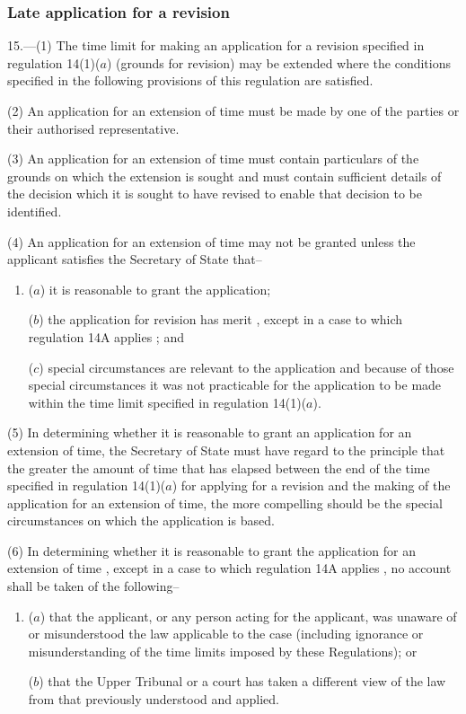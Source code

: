 \documentclass[12pt,a4paper]{article}
\begin{document}

\subsubsection[15. Late application for a revision]{Late application for a revision}

15.---(1)  The time limit for making an application for a revision specified in regulation 14(1)($a$)  (grounds for revision) may be extended where the conditions specified in the following provisions of this regulation are satisfied.

(2) An application for an extension of time must be made by one of the parties or their authorised representative.

(3) An application for an extension of time must contain particulars of the grounds on which the extension is sought and must contain sufficient details of the decision which it is sought to have revised to enable that decision to be identified.

(4) An application for an extension of time may not be granted unless the applicant satisfies the Secretary of State that–
\begin{enumerate}\item[]
($a$) it is reasonable to grant the application;

($b$) the application for revision has merit%
, except in a case to which regulation 14A applies%
; and

($c$) special circumstances are relevant to the application and because of those special circumstances it was not practicable for the application to be made within the time limit specified in regulation 14(1)($a$).
\end{enumerate}

(5) In determining whether it is reasonable to grant an application for an extension of time, the Secretary of State must have regard to the principle that the greater the amount of time that has elapsed between the end of the time specified in regulation 14(1)($a$)  for applying for a revision and the making of the application for an extension of time, the more compelling should be the special circumstances on which the application is based.

(6) In determining whether it is reasonable to grant the application for an extension of time%
, except in a case to which regulation 14A applies%
, no account shall be taken of the following–
\begin{enumerate}\item[]
($a$) that the applicant, or any person acting for the applicant, was unaware of or misunderstood the law applicable to the case (including ignorance or misunderstanding of the time limits imposed by these Regulations); or

($b$) that the Upper Tribunal or a court has taken a different view of the law from that previously understood and applied.
\end{enumerate}
\end{document}
